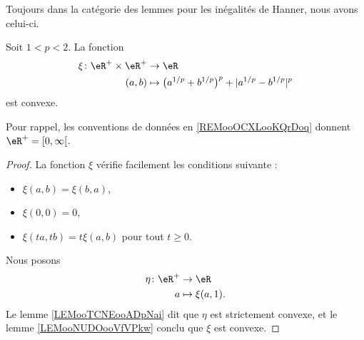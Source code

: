 	Toujours dans la catégorie des lemmes pour les inégalités de Hanner, nous avons celui-ci.
	\begin{lemma}
		Soit \( 1<p<2\). La fonction
		\begin{equation}
			\begin{aligned}
				\xi\colon \eR^+\times \eR^+ & \to \eR                                                     \\
				(a,b)                       & \mapsto \big( a^{1/p}+b^{1/p} \big)^p+| a^{1/p}-b^{1/p} |^p
			\end{aligned}
		\end{equation}
		est convexe.

		Pour rappel, les conventions de données en \ref{REMooOCXLooKQrDoq} donnent \( \eR^+=\mathopen[ 0 , \infty \mathclose[\).
	\end{lemma}

	\begin{proof}
		La fonction \( \xi\) vérifie facilement les conditions suivante :
		\begin{itemize}
			\item \( \xi(a,b)=\xi(b,a)\),
			\item \( \xi(0,0)=0\),
			\item \( \xi(ta,tb)=t\xi(a,b)\) pour tout \( t\geq 0\).
		\end{itemize}
		Nous posons
		\begin{equation}
			\begin{aligned}
				\eta\colon \eR^+ & \to \eR           \\
				a                & \mapsto \xi(a,1).
			\end{aligned}
		\end{equation}
		Le lemme \ref{LEMooTCNEooADpNai} dit que \( \eta\) est strictement convexe, et le lemme \ref{LEMooNUDOooVfVPkw} conclu que \( \xi\) est convexe.
	\end{proof}

